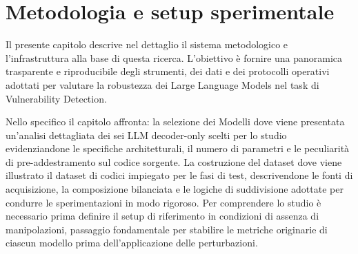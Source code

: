 \chapter{Metodologia e setup sperimentale}
Il presente capitolo descrive nel dettaglio il sistema metodologico e l'infrastruttura alla base di questa ricerca. L'obiettivo è fornire una panoramica trasparente e riproducibile degli strumenti, dei dati e dei protocolli operativi adottati per valutare la robustezza dei Large Language Models nel task di Vulnerability Detection.

Nello specifico il capitolo affronta: la selezione dei Modelli dove viene presentata un'analisi dettagliata dei sei LLM decoder-only scelti per lo studio evidenziandone le specifiche architetturali, il numero di parametri e le peculiarità di pre-addestramento sul codice sorgente.
La costruzione del dataset dove viene illustrato il dataset di codici impiegato per le fasi di test, descrivendone le fonti di acquisizione, la composizione bilanciata e le logiche di suddivisione adottate per condurre le sperimentazioni in modo rigoroso.
Per comprendere lo studio è necessario prima definire il setup di riferimento in condizioni di assenza di manipolazioni, passaggio fondamentale per stabilire le metriche originarie di ciascun modello prima dell'applicazione delle perturbazioni.



